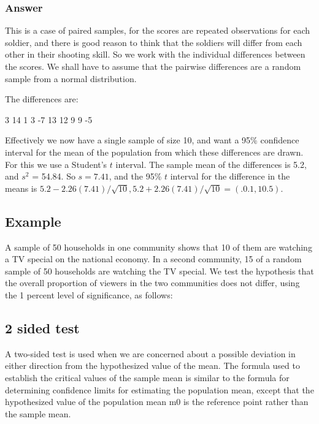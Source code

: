 \subsubsection{Answer}


This is a case of paired samples, for the scores are repeated observations for each
soldier, and there is good reason to think that the soldiers will differ from each other
in their shooting skill. So we work with the individual differences between the scores.
We shall have to assume that the pairwise differences are a random sample from a
normal distribution.

The differences are:

3 14 1 3 -7 13 12 9 9 -5


Effectively we now have a single sample of size 10, and want a 95\% confidence
interval for the mean of the population from which these differences are drawn. For
this we use a Student's $t$ interval. The sample mean of the differences is 5.2, and
$s^2$ = 54.84. So $s = 7.41$, and the 95\% $t$ interval for the difference in the means is
$5.2 - 2.26(7.41)/\sqrt{10},  5.2 + 2.26(7.41)/\sqrt{10} = (.0.1, 10.5)$.

\subsection{Example} A sample of 50 households in one community
shows that 10 of them are watching a TV special on the national
economy. In a second community, 15 of a random sample of 50
households are watching the TV special. We test the hypothesis
that the overall proportion of viewers in the two communities does
not differ, using the 1 percent level of significance, as follows:

\subsection{2 sided test}
A two-sided test is used when we are concerned about a possible
deviation in either direction from the hypothesized value of the
mean. The formula used to establish the critical values of the
sample mean is similar to the formula for determining confidence
limits for estimating the population mean, except that the
hypothesized value of the population mean m0 is the reference
point rather than the sample mean.







%
 